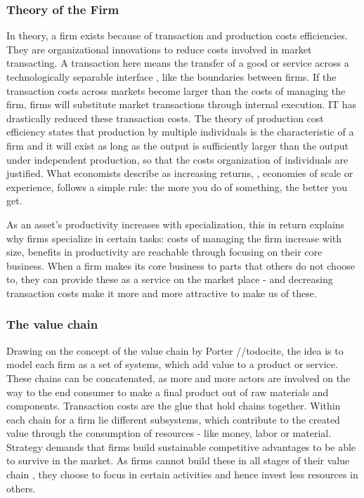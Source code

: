 		\subsubsection{Theory of the Firm}
		In theory, a firm exists because of transaction and production costs efficiencies. They are organizational innovations to reduce costs involved in market transacting. A transaction here means the transfer of a good or service across a technologically separable interface \cite{williamson1981economics, williamson1971vertical}, like the boundaries between firms. If the transaction costs across markets become larger than the costs of managing the firm, firms will substitute market transactions through internal execution. IT has drastically reduced these transaction costs.
		The theory of production cost efficiency states that production by multiple individuals is the characteristic of a firm \cite{alchian1972production} and it will exist as long as the output is sufficiently larger than the output under independent production, so that the costs organization of individuals are justified. What economists describe as increasing returns, \ie, economies of scale or experience, follows a simple rule: the more you do of something, the better you get.
		
		As an asset's productivity increases with specialization, this in return explains why firms specialize in certain tasks: costs of managing the firm increase with size,  benefits in productivity are reachable through focusing on their core business.
		When a firm makes its core business to parts that others do not choose to, they can provide these as a service on the market place - and decreasing transaction costs make it more and more attractive to make us of these. 
		
		\subsubsection{The value chain}
		Drawing on the concept of the value chain by Porter //todocite, the idea is to model each firm as a set of systems, which add value to a product or service. These chains can be concatenated, as more and more actors are involved on the way to the end consumer to make a final product out of raw materials and components. Transaction costs are the glue that hold chains together. Within each chain for a firm lie different subsystems, which contribute to the created value through the consumption of resources - like money, labor or material. Strategy demands that firms build sustainable competitive advantages to be able to survive in the market. As firms cannot build these in all stages of their value chain \cite{Ramachandran2004}, they choose to focus in certain activities and hence invest less resources in others. 
		

